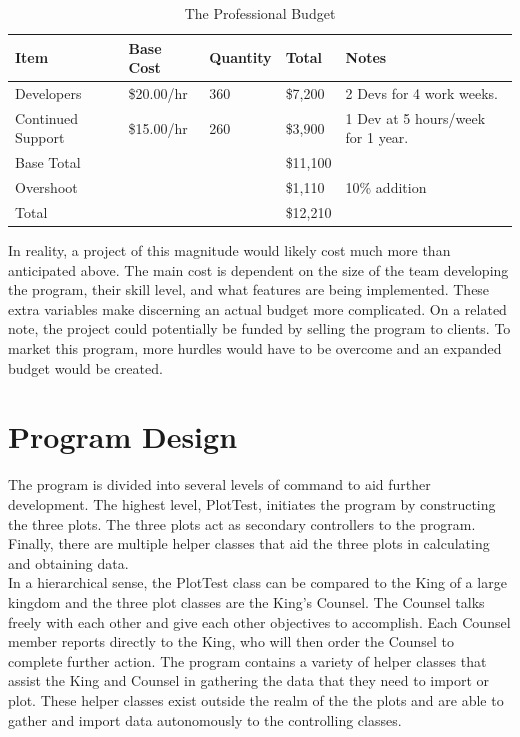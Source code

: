 \documentclass[12pt]{article}
\begin{document}
\begin{table}[H]
\caption{The Professional Budget}
\begin{tabular}{ l | l | l || l | l}
  \hline                        
  Item & Base Cost & Quantity & Total & Notes \\ \hline
  Developers & \$20.00/hr & 360 & \$7,200 & 2 Devs for 4 work weeks.\\
  Continued Support & \$15.00/hr & 260 & \$3,900 & 1 Dev at 5 hours/week for 1 year.\\ \hline
  Base Total & & & \$11,100 & \\
  Overshoot & & & \$1,110 & 10\% addition\\ \hline
  Total & & & \$12,210 & \\
  \hline  
\end{tabular} 
\label{TAB:BUG}
\end{table}

In reality, a project of this magnitude would likely cost much more than anticipated above. The main cost is dependent on the size of the team developing the program, their skill level, and what features are being implemented. These extra variables make discerning an actual budget more complicated. On a related note, the project could potentially be funded by selling the program to clients. To market this program, more hurdles would have to be overcome and an expanded budget would be created.

\section{Program Design}

The program is divided into several levels of command to aid further development. The highest level, PlotTest, initiates the program by constructing the three plots. The three plots act as secondary controllers to the program. Finally, there are multiple helper classes that aid the three plots in calculating and obtaining data. \\

In a hierarchical sense, the PlotTest class can be compared to the King of a large kingdom and the three plot classes are the King's Counsel. The Counsel talks freely with each other and give each other objectives to accomplish. Each Counsel member reports directly to the King, who will then order the Counsel to complete further action. The program contains a variety of helper classes that assist the King and Counsel in gathering the data that they need to import or plot. These helper classes exist outside the realm of the the plots and are able to gather and import data autonomously to the controlling classes.
\end{document}
